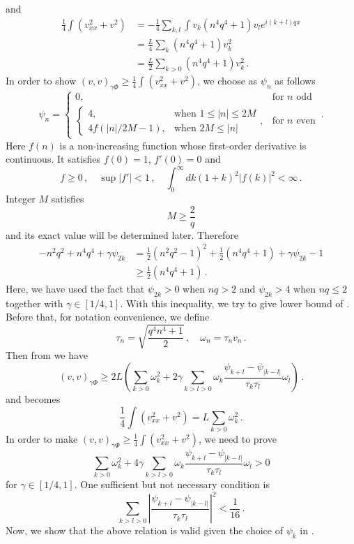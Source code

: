 and
\begin{align}
  \frac{1}{4}\int (v_{xx}^2 + v^2) 
  & = -\frac{1}{4}\sum_{k, l}\int v_k(n^4q^4 + 1)v_l e^{i(k+l)qx} \nonumber \\
  & = \frac{L}{4}\sum_{k} (n^4q^4+1)v_k^2 \nonumber \\
  & = \frac{L}{2}\sum_{k>0} (n^4q^4+1)v_k^2 \,. \label{eq:ks_prop1_right}
\end{align}
In order to show $(v, v)_{\gamma\Phi} \ge \frac{1}{4}\int (v_{xx}^2 + v^2)$,
we choose as $\psi_n$ as follows 
\begin{equation}
  \label{eq:ks_prop1_phi}
  \psi_n = 
  \begin{cases}
    0, & \text{for } n \text{ odd} \\
    \begin{cases}
      4, & \text{when } 1 \le |n| \le 2M \\
      4f(|n|/2M - 1), & \text{when } 2M \le |n|
    \end{cases},
    & \text{for } n \text{ even} 
  \end{cases}
  \,.
\end{equation}
Here $f(n)$ is a non-increasing function whose first-order derivative is 
continuous. It satisfies $f(0) = 1$, $f'(0)=0$ and 
\begin{equation}
  \label{eq:ks_prop1_f}
  f \ge 0\,,\quad \sup|f'| < 1\,,\quad \int_0^\infty dk(1+k)^2|f(k)|^2 < \infty
  \,.
\end{equation}
Integer $M$ satisfies
\begin{equation}
  \label{eq:ks_prop1_m}
  M \ge \frac{2}{q}
\end{equation}
and its exact value will be determined later. Therefore
\begin{align*}
  -n^2q^2+n^4q^4+\gamma\psi_{2k} 
  & = \frac{1}{2}(n^2q^2-1)^2 + \frac{1}{2}(n^4q^4+1) + \gamma\psi_{2k} - 1 \\
  & \ge \frac{1}{2}(n^4q^4+1)
    \,.
\end{align*}
Here, we have used the fact that $\psi_{2k}>0$ when $nq > 2$ and 
$\psi_{2k} > 4$ when $nq \le 2$ together with $\gamma \in [1/4, 1]$.
With this inequality, we try to give lower bound of .
Before that, for notation convenience, we define
\begin{equation}
  \label{eq:ks_prop1_tau}
  \tau_n = \sqrt{\frac{q^4n^4+1}{2}} \,,\quad 
  \omega_n = \tau_nv_n
  \,.
\end{equation}
Then from  we have 
\[
  (v, v)_{\gamma\Phi} \ge 2L \left(\sum_{k>0}\omega_k^2 + 2\gamma \sum_{k>l>0}
    \omega_k\frac{\psi_{k+l} - \psi_{|k-l|}}{\tau_k\tau_l}\omega_l
  \right)
  \,.
\]
and  becomes
\[
  \frac{1}{4}\int (v_{xx}^2 + v^2) = L \sum_{k>0}\omega_k^2
  \,.
\]
In order to
make $(v, v)_{\gamma\Phi} \ge \frac{1}{4}\int (v_{xx}^2 + v^2)$, we need to prove 
\[
  \sum_{k>0}\omega_k^2 + 4\gamma \sum_{k>l>0}
  \omega_k\frac{\psi_{k+l} - \psi_{|k-l|}}{\tau_k\tau_l}\omega_l > 0
\]
for $\gamma \in [1/4, 1]$.
One sufficient but not necessary condition is
\[
  \sum_{k>l>0} \left|\frac{\psi_{k+l} - \psi_{|k-l|}}{\tau_k\tau_l} \right|^2 < \frac{1}{16}
  \,.
\]
Now, we show that the above relation is valid given the choice of $\psi_k$
in .

